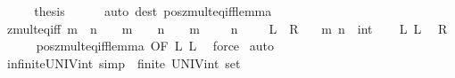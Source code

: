 \begin{isabellebody}
\ \ \isamarkupfalse%
\ \isamarkupfalse%
\ {\isacharquery}{\kern0pt}thesis\isanewline
\ \ \ \ \isamarkupfalse%
\ {\isacharparenleft}{\kern0pt}auto\ dest{\isacharcolon}{\kern0pt}\ pos{\isacharunderscore}{\kern0pt}zmult{\isacharunderscore}{\kern0pt}eq{\isacharunderscore}{\kern0pt}{}{\isacharunderscore}{\kern0pt}iff{\isacharunderscore}{\kern0pt}lemma{\isacharparenright}{\kern0pt}\isanewline
{}\isamarkupfalse%
%
\endisatagproof
{\isafoldproof}%
%
\isadelimproof
\isanewline
%
\endisadelimproof
\isanewline
{}\isamarkupfalse%
\ zmult{\isacharunderscore}{\kern0pt}eq{\isacharunderscore}{\kern0pt}{}{\isacharunderscore}{\kern0pt}iff{\isacharcolon}{\kern0pt}\ {\isachardoublequoteopen}m\ {\isacharasterisk}{\kern0pt}\ n\ {\isacharequal}{\kern0pt}\ {}\ {\isasymlongleftrightarrow}\ {\isacharparenleft}{\kern0pt}m\ {\isacharequal}{\kern0pt}\ {}\ {\isasymand}\ n\ {\isacharequal}{\kern0pt}\ {}{\isacharparenright}{\kern0pt}\ {\isasymor}\ {\isacharparenleft}{\kern0pt}m\ {\isacharequal}{\kern0pt}\ {\isacharminus}{\kern0pt}\ {}\ {\isasymand}\ n\ {\isacharequal}{\kern0pt}\ {\isacharminus}{\kern0pt}\ {}{\isacharparenright}{\kern0pt}{\isachardoublequoteclose}\ {\isacharparenleft}{\kern0pt}\ {\isachardoublequoteopen}{\isacharquery}{\kern0pt}L\ {\isacharequal}{\kern0pt}\ {\isacharquery}{\kern0pt}R{\isachardoublequoteclose}{\isacharparenright}{\kern0pt}\isanewline
\ \ \ m\ n\ {\isacharcolon}{\kern0pt}{\isacharcolon}{\kern0pt}\ int\isanewline
%
\isadelimproof
%
\endisadelimproof
%
\isatagproof
{}\isamarkupfalse%
\isanewline
\ \ \isamarkupfalse%
\ L{\isacharcolon}{\kern0pt}\ {\isacharquery}{\kern0pt}L\ \isamarkupfalse%
\ {\isacharquery}{\kern0pt}R\isanewline
\ \ \ \ \isamarkupfalse%
\ pos{\isacharunderscore}{\kern0pt}zmult{\isacharunderscore}{\kern0pt}eq{\isacharunderscore}{\kern0pt}{}{\isacharunderscore}{\kern0pt}iff{\isacharunderscore}{\kern0pt}lemma\ {\isacharbrackleft}{\kern0pt}OF\ L{\isacharbrackright}{\kern0pt}\ L\ \isamarkupfalse%
\ force\isanewline
{}\isamarkupfalse%
\ auto%
\endisatagproof
{\isafoldproof}%
%
\isadelimproof
\isanewline
%
\endisadelimproof
\isanewline
{}\isamarkupfalse%
\ infinite{\isacharunderscore}{\kern0pt}UNIV{\isacharunderscore}{\kern0pt}int\ {\isacharbrackleft}{\kern0pt}simp{\isacharbrackright}{\kern0pt}{\isacharcolon}{\kern0pt}\ {\isachardoublequoteopen}{\isasymnot}\ finite\ {\isacharparenleft}{\kern0pt}UNIV{\isacharcolon}{\kern0pt}{\isacharcolon}{\kern0pt}int\ set{\isacharparenright}{\kern0pt}{\isachardoublequoteclose}\isanewline

\end{isabellebody}
